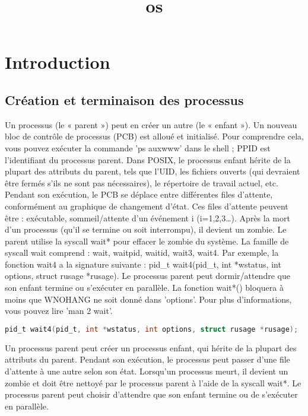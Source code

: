 \documentclass[12pt]{report}
\title{os}
\author{}
\begin{document}
\maketitle
\tableofcontents
\newpage

\section{Introduction}
\subsection{Création et terminaison des processus}
Un processus (le « parent ») peut en créer un autre (le « enfant »). Un nouveau bloc de contrôle de processus (PCB) est alloué et initialisé. Pour comprendre cela, vous pouvez exécuter la commande 'ps auxwww' dans le shell ; PPID est l'identifiant du processus parent. Dans POSIX, le processus enfant hérite de la plupart des attributs du parent, tels que l'UID, les fichiers ouverts (qui devraient être fermés s'ils ne sont pas nécessaires), le répertoire de travail actuel, etc. Pendant son exécution, le PCB se déplace entre différentes files d'attente, conformément au graphique de changement d'état. Ces files d'attente peuvent être : exécutable, sommeil/attente d'un événement i (i=1,2,3…). Après la mort d'un processus (qu'il se termine ou soit interrompu), il devient un zombie. Le parent utilise la syscall wait* pour effacer le zombie du système. La famille de syscall wait comprend : wait, waitpid, waitid, wait3, wait4. Par exemple, la fonction wait4 a la signature suivante : pid_t wait4(pid_t, int *wstatus, int options, struct rusage *rusage). Le processus parent peut dormir/attendre que son enfant termine ou s'exécuter en parallèle. La fonction wait*() bloquera à moins que WNOHANG ne soit donné dans 'options'. Pour plus d'informations, vous pouvez lire 'man 2 wait'.
\begin{lstlisting}[language=C]
pid_t wait4(pid_t, int *wstatus, int options, struct rusage *rusage);
\end{lstlisting}
\begin{tcolorbox}[colback=yellow!5, colframe=yellow!80!black, title={\faBookmark À retenir}]
Un processus parent peut créer un processus enfant, qui hérite de la plupart des attributs du parent. Pendant son exécution, le processus peut passer d'une file d'attente à une autre selon son état. Lorsqu'un processus meurt, il devient un zombie et doit être nettoyé par le processus parent à l'aide de la syscall wait*. Le processus parent peut choisir d'attendre que son enfant termine ou de s'exécuter en parallèle.
\end{tcolorbox}
\end{document}
